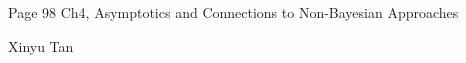 \documentclass{article}
\begin{document}
\large %


{\Large Page 98 %
\hfill  Ch4, Asymptotics and Connections to Non-Bayesian Approaches}

\begin{center}
{\Large Xinyu Tan} 
\end{center}
\vspace{0.05in}

 \renewcommand{\labelitemi}{$\textendash$}
\end{document}
